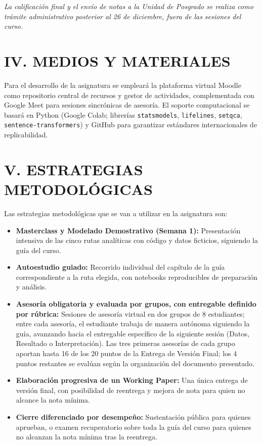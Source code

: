\documentclass[11pt,a4paper]{article}
\begin{document}
\normalsize

\noindent
\textit{La calificación final y el envío de notas a la Unidad de Posgrado se realiza como trámite administrativo posterior al 26 de diciembre, fuera de las sesiones del curso.}

\section{IV. MEDIOS Y MATERIALES}
Para el desarrollo de la asignatura se empleará la plataforma virtual Moodle como repositorio central de recursos y gestor de actividades, complementada con Google Meet para sesiones sincrónicas de asesoría. El soporte computacional se basará en Python (Google Colab; librerías \texttt{statsmodels}, \texttt{lifelines}, \texttt{setqca}, \texttt{sentence-transformers}) y GitHub para garantizar estándares internacionales de replicabilidad.

\section{V. ESTRATEGIAS METODOLÓGICAS}
Las estrategias metodológicas que se van a utilizar en la asignatura son:
\begin{itemize}
    \item \textbf{Masterclass y Modelado Demostrativo (Semana 1):} Presentación intensiva de las cinco rutas analíticas con código y datos ficticios, siguiendo la guía del curso.
    \item \textbf{Autoestudio guiado:} Recorrido individual del capítulo de la guía correspondiente a la ruta elegida, con notebooks reproducibles de preparación y análisis.
    \item \textbf{Asesoría obligatoria y evaluada por grupos, con entregable definido por rúbrica:} Sesiones de asesoría virtual en dos grupos de 8 estudiantes; entre cada asesoría, el estudiante trabaja de manera autónoma siguiendo la guía, avanzando hacia el entregable específico de la siguiente sesión (Datos, Resultado o Interpretación). Las tres primeras asesorías de cada grupo aportan hasta 16 de los 20 puntos de la Entrega de Versión Final; los 4 puntos restantes se evalúan según la organización del documento presentado.
    \item \textbf{Elaboración progresiva de un Working Paper:} Una única entrega de versión final, con posibilidad de reentrega y mejora de nota para quien no alcance la nota mínima.
    \item \textbf{Cierre diferenciado por desempeño:} Sustentación pública para quienes aprueban, o examen recuperatorio sobre toda la guía del curso para quienes no alcanzan la nota mínima tras la reentrega.
\end{itemize}
\end{document}
